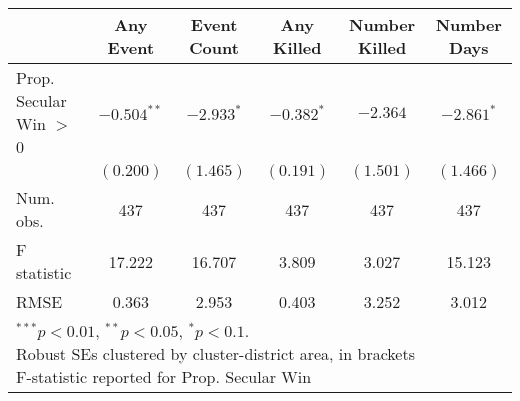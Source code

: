 
\begin{tabular}{l c c c c c }
\hline
 & Any Event & Event Count & Any Killed & Number Killed & Number Days \\
\hline
Prop. Secular Win $>$ 0 & $-0.504^{**}$ & $-2.933^{*}$ & $-0.382^{*}$ & $-2.364$  & $-2.861^{*}$ \\
                        & $(0.200)$     & $(1.465)$    & $(0.191)$    & $(1.501)$ & $(1.466)$    \\
\hline
Num. obs.               & 437           & 437          & 437          & 437       & 437          \\
F statistic             & 17.222        & 16.707       & 3.809        & 3.027     & 15.123       \\
RMSE                    & 0.363         & 2.953        & 0.403        & 3.252     & 3.012        \\
\hline
\multicolumn{6}{l}{\scriptsize{\parbox{.4\linewidth}{\vspace{2pt}$^{***}p<0.01$, $^{**}p<0.05$, $^*p<0.1$. \\
       Robust SEs clustered by cluster-district area, in brackets\\ F-statistic reported for Prop. Secular Win}}}
\end{tabular}
